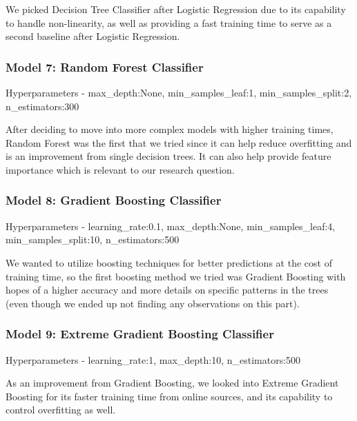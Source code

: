 \documentclass[11pt,a4paper]{article}
\begin{document}
We picked Decision Tree Classifier after Logistic Regression due to its capability to handle non-linearity, as well as providing a fast training time to serve as a second baseline after Logistic Regression.

\subsubsection{Model 7: Random Forest Classifier}
Hyperparameters - max\_depth:None, min\_samples\_leaf:1, min\_samples\_split:2, n\_estimators:300

After deciding to move into more complex models with higher training times, Random Forest was the first that we tried since it can help reduce overfitting and is an improvement from single decision trees. It can also help provide feature importance which is relevant to our research question.

\subsubsection{Model 8: Gradient Boosting Classifier}
Hyperparameters - learning\_rate:0.1, max\_depth:None, min\_samples\_leaf:4, min\_samples\_split:10, n\_estimators:500

We wanted to utilize boosting techniques for better predictions at the cost of training time, so the first boosting method we tried was Gradient Boosting with hopes of a higher accuracy and more details on specific patterns in the trees (even though we ended up not finding any observations on this part).

\subsubsection{Model 9: Extreme Gradient Boosting Classifier}
Hyperparameters - learning\_rate:1, max\_depth:10, n\_estimators:500

As an improvement from Gradient Boosting, we looked into Extreme Gradient Boosting for its faster training time from online sources, and its capability to control overfitting as well.
\end{document}
